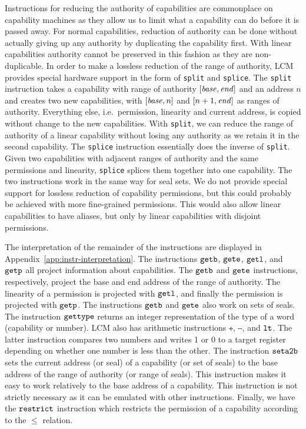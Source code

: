 \documentclass[acmsmall,screen]{acmart}\settopmatter{}
\newcommand{\trgcm}{\textsc{LCM}}
\newenvironment{jversion}%
    {\color{OliveGreen}}{}
\begin{document}
Instructions for reducing the authority of capabilities are commonplace on capability machines as they allow us to limit what a capability can do before it is passed away.
For normal capabilities, reduction of authority can be done without actually giving up any authority by duplicating the capability first.
With linear capabilities authority cannot be preserved in this fashion as they are non-duplicable.
In order to make a lossless reduction of the range of authority, \trgcm{} provides special hardware support in the form of \texttt{split} and \texttt{splice}.
The \texttt{split} instruction takes a capability with range of authority $[\mathit{base},\mathit{end}]$ and an address $n$ and creates two new capabilities, with $[\mathit{base},n]$ and $[n+1,\mathit{end}]$ as ranges of authority.
Everything else, i.e.\ permission, linearity and current address, is copied without change to the new capabilities.
With \texttt{split}, we can reduce the range of authority of a linear capability without losing any authority as we retain it in the second capability.
The \texttt{splice} instruction essentially does the inverse of \texttt{split}.
Given two capabilities with adjacent ranges of authority and the same permissions and linearity, \texttt{splice} splices them together into one capability.
The two instructions work in the same way for seal sets.
We do not provide special support for lossless reduction of capability permissions, but this could probably be achieved with more fine-grained permissions.
This would also allow linear capabilities to have aliases, but only by linear capabilities with disjoint permissions.

\begin{jversion}
  The interpretation of the remainder of the instructions are displayed in Appendix~\ref{app:instr-interpretation}.
  The instructions $\tgetb{}{}$, $\tgete{}{}$, $\tgetlin{}{}$, and $\tgetp{}{}$ all project information about capabilities.
  The $\tgetb{}{}$ and $\tgete{}{}$ instructions, respectively, project the base and end address of the range of authority.
  The linearity of a permission is projected with $\tgetlin{}{}$, and finally the permission is projected with $\tgetp{}{}$.
  The instructions $\tgetb{}{}$ and $\tgete{}{}$ also work on sets of seals.
  The instruction $\tisptr{}{}$ returns an integer representation of the type of a word (capability or number).
  \trgcm{} also has arithmetic instructions $\tplus{}{}{}$, $\tminus{}{}{}$, and $\tlt{}{}{}$.
  The latter instruction compares two numbers and writes 1 or 0 to a target register depending on whether one number is less than the other.
  The instruction $\tsetatob{}$ sets the current address (or seal) of a capability (or set of seals) to the base address of the range of authority (or range of seals).
  This instruction makes it easy to work relatively to the base address of a capability.
  This instruction is not strictly necessary as it can be emulated with other instructions.
  Finally, we have the $\trestrict{}{}$ instruction which restricts the permission of a capability according to the $\le$ relation.
\end{jversion}
\end{document}
